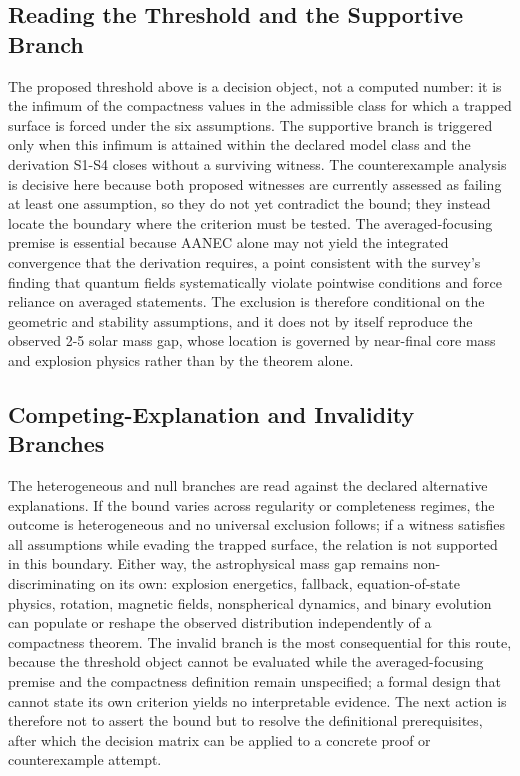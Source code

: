 \documentclass[conference]{IEEEtran}
\begin{document}
\subsection{Reading the Threshold and the Supportive Branch}
The proposed threshold above is a decision object, not a computed number: it is the infimum of the compactness values in the admissible class for which a trapped surface is forced under the six assumptions. The supportive branch is triggered only when this infimum is attained within the declared model class and the derivation S1-S4 closes without a surviving witness. The counterexample analysis is decisive here because both proposed witnesses are currently assessed as failing at least one assumption, so they do not yet contradict the bound; they instead locate the boundary where the criterion must be tested. The averaged-focusing premise is essential because AANEC alone may not yield the integrated convergence that the derivation requires, a point consistent with the survey's finding that quantum fields systematically violate pointwise conditions and force reliance on averaged statements. The exclusion is therefore conditional on the geometric and stability assumptions, and it does not by itself reproduce the observed 2-5 solar mass gap, whose location is governed by near-final core mass and explosion physics rather than by the theorem alone.~\cite{cite_0ed84243cf171bc4,cite_7a407c865faafd11}

\subsection{Competing-Explanation and Invalidity Branches}
The heterogeneous and null branches are read against the declared alternative explanations. If the bound varies across regularity or completeness regimes, the outcome is heterogeneous and no universal exclusion follows; if a witness satisfies all assumptions while evading the trapped surface, the relation is not supported in this boundary. Either way, the astrophysical mass gap remains non-discriminating on its own: explosion energetics, fallback, equation-of-state physics, rotation, magnetic fields, nonspherical dynamics, and binary evolution can populate or reshape the observed distribution independently of a compactness theorem. The invalid branch is the most consequential for this route, because the threshold object cannot be evaluated while the averaged-focusing premise and the compactness definition remain unspecified; a formal design that cannot state its own criterion yields no interpretable evidence. The next action is therefore not to assert the bound but to resolve the definitional prerequisites, after which the decision matrix can be applied to a concrete proof or counterexample attempt.~\cite{cite_72d7ff391b29c495,cite_c369df652181e8f7}
\end{document}
